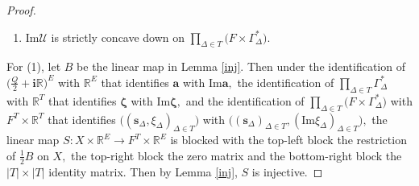 \documentclass[11pt]{article}
\theoremstyle{remark}
\theoremstyle{remark}
\numberwithin{equation}{section}
\begin{document}
\begin{proof}
\begin{enumerate}[(1)]
    \item  $\mathrm{Im}\mathcal U$ is strictly concave down on $\prod_{\Delta\in T} \big(F\times \Gamma_\Delta^*\big).$
\end{enumerate}








For (1), let $B$ be the linear map in Lemma \ref{inj}. Then under the identification of $\big(\frac{Q}{2}+\mathbf i \mathbb R\big)^E$ with $\mathbb R^E$ that identifies  $\boldsymbol a$ with $\mathrm{Im}\boldsymbol a,$ the identification of $\prod_{\Delta\in T}\Gamma_\Delta^*$ with $\mathbb R^T$ that identifies $\boldsymbol \zeta$ with $\mathrm{Im}\boldsymbol \zeta,$
and the identification of $\prod_{\Delta\in T}\big(F\times \Gamma_\Delta^*\big)$ with $F^T\times \mathbb R^T$  that identifies $\big((\boldsymbol s_\Delta,\xi_\Delta)_{\Delta\in T}\big)$ with $\big((\boldsymbol s_\Delta)_{\Delta\in T},(\mathrm{Im}\xi_\Delta)_{\Delta\in T}\big),$ the linear map 
 $S: X\times \mathbb R^E \to F^T\times \mathbb R^E$ is blocked  with the top-left block the restriction of $\frac{1}{2}B$ on $X,$ the top-right block the zero matrix and the bottom-right block the $|T|\times |T|$ identity matrix. Then by Lemma \ref{inj}, $S$ is injective. 
\medskip




\end{proof}
\end{document}
